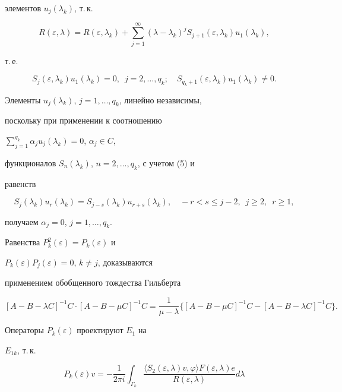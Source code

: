 элементов $u_j(\lambda_k)$, т.\,к.


$$


R(\varepsilon,\lambda)=


R(\varepsilon,\lambda_k)+\sum_{j=1}^{\infty}(\lambda-\lambda_k)^jS_{j+1}(


\varepsilon,\lambda_k)u_1(\lambda_k),


$$


т.\,е.


\begin{equation}


S_j(\varepsilon,\lambda_k)u_1 (\lambda_k)=0,\ \; j=2,\dotsc, q_k;


\quad S_{q_k+1}(\varepsilon,\lambda_k) u_1(\lambda_k)\ne 0.


\end{equation}





Элементы $u_j(\lambda_k)$, $j=1,\dotsc, q_k$, линейно независимы,


поскольку при применении к соотношению


$\sum\limits_{j=1}^{q_k}\alpha_ju_j(\lambda_k)= 0$, $\alpha_j\in C$,


функционалов $S_n(\lambda_k)$, $n=2,\dotsc, q_k$, с учетом (5) и


равенств


$$


S_j(\lambda_k)u_r(\lambda_k)=S_{j-s}(\lambda_k)u_{r+s}


(\lambda_k),\quad -r<s\le j-2,\ \; j\ge2,\ \; r\ge1,


$$


получаем $\alpha_j=0$, $j=1,\dotsc, q_k$.


Равенства $P_k^2(\varepsilon)=P_k(\varepsilon)$ и


$P_k(\varepsilon)P_j(\varepsilon)=0$, $k\ne j$, доказываются


применением обобщенного тождества Гильберта


$$


[A-B-\lambda C]^{-1}C\cdot[A-B-\mu 


C]^{-1}C=\frac{1}{\mu-\lambda}\{[A-B-\mu C]^{-1}C-[A-B-\lambda C]^


{-1}C\}.


$$


Операторы $P_k(\varepsilon)$ проектируют $E_1$ на


$E_{1k}$, т.\,к.


\begin{equation}


P_k(\varepsilon)v=-\frac{1}{2\pi i}\int_{\Gamma_k}


\frac{\langle S_2(\varepsilon,


\lambda)v, \varphi\rangle F(\varepsilon, \lambda)e}{R(\varepsilon,


\lambda)}d\lambda


\end{equation}


